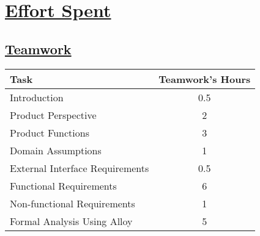 \section[Effort Spent]{\hyperlink{toc}{Effort Spent}}
\label{sec:effortSpent}

\subsection[Teamwork]{\hyperlink{toc}{Teamwork}}
\vspace{2mm}
\begin{center}
	\begin{tabular}{| l | c |}
		\hline
		\textbf{Task} & \textbf{Teamwork's Hours} \\ \hline
		Introduction & 0.5 \\ \hline
		Product Perspective & 2 \\ \hline
		Product Functions & 3 \\ \hline
		Domain Assumptions & 1 \\ \hline
		External Interface Requirements & 0.5 \\ \hline
		Functional Requirements & 6 \\ \hline
		Non-functional Requirements & 1 \\ \hline
		Formal Analysis Using Alloy & 5 \\
		\hline	
	\end{tabular}
\end{center}

